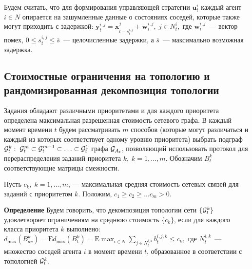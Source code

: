 \documentclass{spisok-article}
\begin{document}
Будем считать, что для формирования управляющей стратегии $\mathbf u_t^i$ каждый агент $i \in N$ опирается на зашумленные данные о состояниях соседей, которые также могут приходить с задержкой: $\mathbf y_{t}^{i, j} = \mathbf x_{t - s_{t}^{i, j} }^{j}  + \mathbf w_{t}^{i, j},\; j \in N_{t}^{i},$
где $\mathbf w_{t}^{i, j}$~---  вектор помех, $0 \le s_{t}^{i, j} \le \bar s$~--- целочисленные задержки, а $\bar s$~---  максимально возможная задержка.

\subsection{Стоимостные ограничения на топологию и рандомизированная декомпозиция топологии}



Задания обладают различными приоритетами и для каждого приоритета определена максимальная разрешенная стоимость сетевого графа. В каждый момент времени $t$ будем рассматривать $m$ способов (которые могут различаться и каждый из которых соответствует одному уровню приоритета) выбрать подграф ${\cal G}_t^k: \; {\cal G}_t^m \subset {\cal G}_t^{m-1} \subset \ldots \subset {\cal G}_t^1$ графа ${\cal G}_{A_t}$, позволяющий использовать протокол для перераспределения заданий приоритета $k, \; k = 1, \ldots, m$. Обозначим $B^k_t$ соответствующие матрицы смежности. %

Пусть $c_k, \; k=1, \ldots, m$,
---
максимальная средняя стоимость сетевых связей для заданий с приоритетом $k$. Положим, $c_1 \geq c_2 \geq \ldots c_m >0$.

{\bf Определение} Будем говорить, что декомпозиция топологии сети $\{{\cal G}_t^k\}$ удовлетворяет ограничениям на среднюю стоимость $\{c_k\}$, если для каждого класса приоритета $k$ выполнено: $
d_{\max}(B_{av}^k) = \mathrm{E} d_{\max}(B_t^k)  = \mathrm{E} \max_{i \in N} \sum_{j \in N_t^{i, k}} b_t^{i, j, k} \leq c_k,$
где $N_t^{i, k}$~--- множество соседей агента $i$ в момент времени $t$, образованное в соответствии с топологией ${\cal G}_t^k$.
\end{document}
